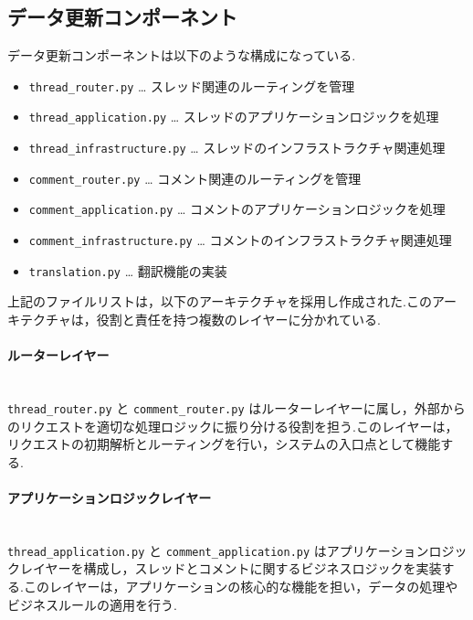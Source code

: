 \documentclass[b5paper,12pt,dvipdfmx]{jsreport}
\newcommand{\red}[1]{\textcolor{red}{#1}}
\begin{document}
\subsection*{データ更新コンポーネント}

データ更新コンポーネントは以下のような構成になっている.

\begin{itemize}
    \item \texttt{thread\_router.py} … スレッド関連のルーティングを管理
    \item \texttt{thread\_application.py} … スレッドのアプリケーションロジックを処理
    \item \texttt{thread\_infrastructure.py} … スレッドのインフラストラクチャ関連処理
    \item \texttt{comment\_router.py} … コメント関連のルーティングを管理
    \item \texttt{comment\_application.py} … コメントのアプリケーションロジックを処理
    \item \texttt{comment\_infrastructure.py} … コメントのインフラストラクチャ関連処理
    \item \texttt{translation.py} … 翻訳機能の実装
\end{itemize}


上記のファイルリストは，以下のアーキテクチャを採用し作成された.このアーキテクチャは，役割と責任を持つ複数のレイヤーに分かれている.

\paragraph{ルーターレイヤー}\mbox{}\\
\texttt{thread\_router.py} と \texttt{comment\_router.py} はルーターレイヤーに属し，外部からのリクエストを適切な処理ロジックに振り分ける役割を担う.このレイヤーは，リクエストの初期解析とルーティングを行い，システムの入口点として機能する.

\paragraph{アプリケーションロジックレイヤー}\mbox{}\\
\texttt{thread\_application.py} と \texttt{comment\_application.py} はアプリケーションロジックレイヤーを構成し，スレッドとコメントに関するビジネスロジックを実装する.このレイヤーは，アプリケーションの核心的な機能を担い，データの処理やビジネスルールの適用を行う.
\end{document}
